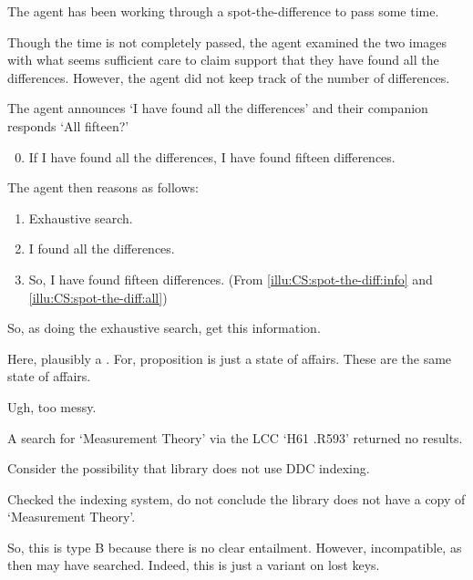\begin{note}
  \begin{illustration}
    \label{illu:CS:spot-the-diff}
    The agent has been working through a spot-the-difference to pass some time.

    Though the time is not completely passed, the agent examined the two images with what seems sufficient care to claim support that they have found all the differences.
    However, the agent did not keep track of the number of differences.

    The agent announces `I have found all the differences' and their companion responds `All fifteen?'

    \begin{enumerate}[label=\arabic*., ref=(I\ref{illu:CS:spot-the-diff}.\arabic*)]
      \setcounter{enumi}{-1}
    \item
      \label{illu:CS:spot-the-diff:info}
      If I have found all the differences, I have found fifteen differences.
    \end{enumerate}

    The agent then reasons as follows:

    \begin{enumerate}[label=\arabic*., ref=(I\ref{illu:CS:spot-the-diff}.\arabic*), resume]
    \item Exhaustive search.
    \item
      \label{illu:CS:spot-the-diff:all}
      I found all the differences.
    \item
      \label{illu:CS:spot-the-diff:fif}
      So, I have found fifteen differences. \hfill (From \ref{illu:CS:spot-the-diff:info} and \ref{illu:CS:spot-the-diff:all})
    \end{enumerate}
  \end{illustration}

  So, as doing the exhaustive search, get this information.

  Here, plausibly a \wit{}.
  For, proposition is just a state of affairs.
  These are the same state of affairs.

  Ugh, too messy.
\end{note}

\begin{note}
  \begin{illustration}
    A search for `Measurement Theory' via the LCC `H61 .R593' returned no results.

    Consider the possibility that library does not use DDC indexing.

    Checked the indexing system, do not conclude the library does not have a copy of `Measurement Theory'.
  \end{illustration}

  So, this is type B because there is no clear entailment.
  However, incompatible, as then may have searched.
  Indeed, this is just a variant on lost keys.
\end{note}

